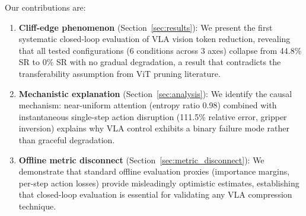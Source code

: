 Our contributions are:
\begin{enumerate}[leftmargin=*]
    \item \textbf{Cliff-edge phenomenon} (Section~\ref{sec:results}): We present the first systematic closed-loop evaluation of VLA vision token reduction, revealing that all tested configurations (6 conditions across 3 axes) collapse from 44.8\% SR to 0\% SR with no gradual degradation, a result that contradicts the transferability assumption from ViT pruning literature.
    \item \textbf{Mechanistic explanation} (Section~\ref{sec:analysis}): We identify the causal mechanism: near-uniform attention (entropy ratio 0.98) combined with instantaneous single-step action disruption (111.5\% relative error, gripper inversion) explains why VLA control exhibits a binary failure mode rather than graceful degradation.
    \item \textbf{Offline metric disconnect} (Section~\ref{sec:metric_disconnect}): We demonstrate that standard offline evaluation proxies (importance margins, per-step action losses) provide misleadingly optimistic estimates, establishing that closed-loop evaluation is essential for validating any VLA compression technique.
\end{enumerate}
